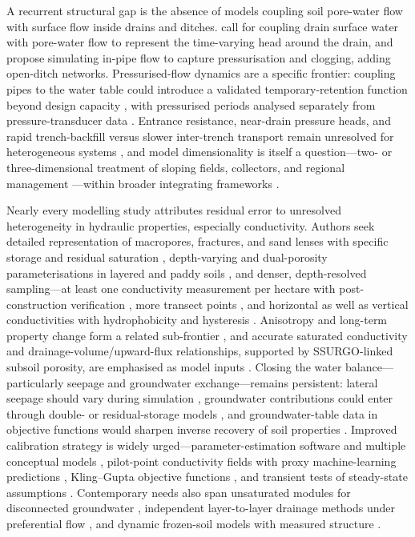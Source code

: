 \documentclass[11pt]{article}
\begin{document}
A recurrent structural gap is the absence of models coupling soil pore-water
flow with surface flow inside drains and ditches. \textcite{Xin2016b} call for
coupling drain surface water with pore-water flow to represent the time-varying
head around the drain, and \textcite{Nousiainen2015} propose simulating in-pipe
flow to capture pressurisation and clogging, adding open-ditch networks.
Pressurised-flow dynamics are a specific frontier: coupling pipes to the water
table could introduce a validated temporary-retention function beyond design
capacity \parencite{Henine2010,Henine2014}, with pressurised periods analysed
separately from pressure-transducer data \parencite{Saadat2018}. Entrance
resistance, near-drain pressure heads, and rapid trench-backfill versus slower
inter-trench transport remain unresolved for heterogeneous systems
\parencite{Messing2006,Rimidis2003}, and model dimensionality is itself a
question---two- or three-dimensional treatment of sloping fields, collectors,
and regional management \parencite{Alakukku2010,FIPPS1989,Carlier2007,Mohanty1998}---within
broader integrating frameworks \parencite{Manguerra1998,SAVABI1993,RevueltaAcosta2021}.

Nearly every modelling study attributes residual error to unresolved
heterogeneity in hydraulic properties, especially conductivity. Authors seek
detailed representation of macropores, fractures, and sand lenses with specific
storage and residual saturation \parencite{DeSchepper2017}, depth-varying and
dual-porosity parameterisations in layered and paddy soils
\parencite{Wesström2003,Karandish2018}, and denser, depth-resolved
sampling---at least one conductivity measurement per hectare with
post-construction verification \parencite{PalaciosVélez2004}, more transect
points \parencite{Messing2006}, and horizontal as well as vertical
conductivities with hydrophobicity and hysteresis \parencite{Tähtikarhu2025}.
Anisotropy and long-term property change form a related sub-frontier
\parencite{Akis2015,Moustafa1998,Koivusalo1999}, and accurate saturated
conductivity and drainage-volume/upward-flux relationships, supported by
SSURGO-linked subsoil porosity, are emphasised as model inputs
\parencite{DeBoer2006,Schilling2015,DeSchepper2015}. Closing the water
balance---particularly seepage and groundwater exchange---remains persistent:
lateral seepage should vary during simulation \parencite{Feng2018}, groundwater
contributions could enter through double- or residual-storage models
\parencite{DaneshYazdi2016}, and groundwater-table data in objective functions
would sharpen inverse recovery of soil properties
\parencite{Sedaghatdoost2018,Sedaghatdoost2019}. Improved calibration strategy is
widely urged---parameter-estimation software and multiple conceptual models
\parencite{Boico2022}, pilot-point conductivity fields with proxy
machine-learning predictions \parencite{Schneider2022}, Kling--Gupta objective
functions \parencite{Brighenti2023}, and transient tests of steady-state
assumptions \parencite{Schilling2022,Gates2002,Burkhalter2006}. Contemporary
needs also span unsaturated modules for disconnected groundwater
\parencite{Kompanizare2024}, independent layer-to-layer drainage methods under
preferential flow \parencite{Ojeda2018}, and dynamic frozen-soil models with
measured structure \parencite{Ulén2016}.
\end{document}
